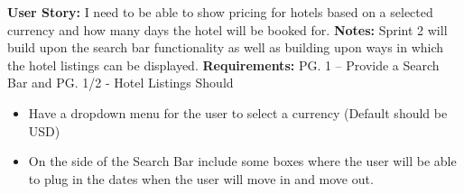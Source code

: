 \documentclass[]{article}
\begin{document}
\noindent
\textbf{User Story:} I need to be able to show pricing for hotels based on a selected currency and how many days the hotel will be booked for. \newline
\textbf{Notes:} Sprint 2 will build upon the search bar functionality as well as building upon ways in which the hotel listings can be displayed. \newline
\textbf{Requirements:} PG. 1 – Provide a Search Bar and PG. 1/2 - Hotel Listings Should
\begin{itemize}
    \item Have a dropdown menu for the user to select a currency (Default should be USD)
    \item On the side of the Search Bar include some boxes where the user will be able to plug in the dates when the user will move in and move out.
\end{itemize}
\end{document}

